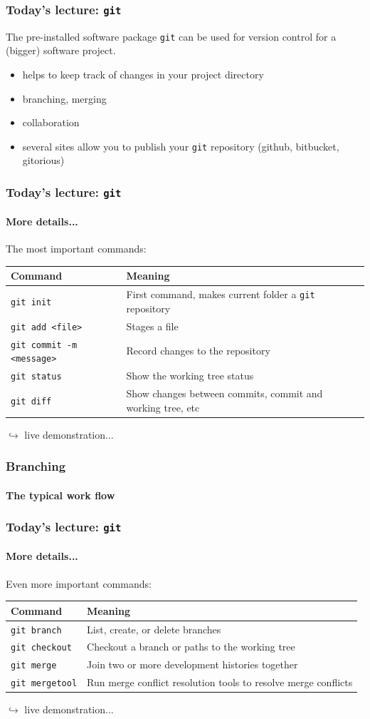 \documentclass{beamer}
\begin{document}
\begin{frame}
\frametitle{Today's lecture: \texttt{git}}
The pre-installed software package \texttt{git} can be used for version control for a (bigger) software project.
\begin{itemize}
 \item helps to keep track of changes in your project directory
 \item branching, merging
 \item collaboration
 \item several sites allow you to publish your \texttt{git} repository (github, bitbucket, gitorious) 
\end{itemize}
\end{frame}
\begin{frame}
\frametitle{Today's lecture: \texttt{git}}
\framesubtitle{More details...}
The most important commands:

\begin{table}
\begin{tabularx}{\textwidth}{l|X}
Command & Meaning \\
 \hline
 \texttt{git init} & First command, makes current folder a \texttt{git} repository\\
 \texttt{git add <file>} & Stages a file\\
 \texttt{git commit -m <message>} & Record changes to the repository\\
 \texttt{git status} & Show the working tree status\\
 \texttt{git diff} & Show changes between commits, commit and working tree, etc\\
\end{tabularx}
\end{table}
\hfill $\hookrightarrow$ live demonstration...
\end{frame}
\begin{frame}
\frametitle{Branching}
\framesubtitle{The typical work flow}
\end{frame}
\begin{frame}
\frametitle{Today's lecture: \texttt{git}}
\framesubtitle{More details...}
Even more important commands:
\begin{table}
\begin{tabularx}{\textwidth}{l|X}
Command & Meaning \\
 \hline
 \texttt{git branch} & List, create, or delete branches\\
 \texttt{git checkout} & Checkout a branch or paths to the working tree\\
 \texttt{git merge} & Join two or more development histories together\\
 \texttt{git mergetool} & Run merge conflict resolution tools to resolve merge conflicts\\
\end{tabularx}
\end{table}
\hfill $\hookrightarrow$ live demonstration...
\end{frame}
\end{document}
